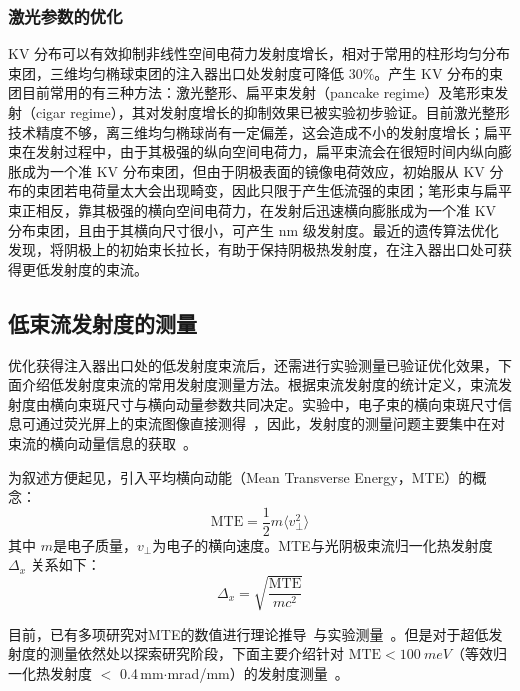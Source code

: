 \subsubsection{激光参数的优化}
KV 分布\cite{Kapchinskij:1959aa}可以有效抑制非线性空间电荷力发射度增长\cite{Limborg-Deprey:2006aa,Khojoyan:2013aa}，相对于常用的柱形均匀分布束团，三维均匀椭球束团的注入器出口处发射度可降低 30\%\cite{Khojoyan:2014aa}。产生 KV 分布的束团目前常用的有三种方法：激光整形、扁平束发射（pancake regime）及笔形束发射（cigar regime），其对发射度增长的抑制效果已被实验初步验证\cite{Khojoyan:2013aa,Khojoyan:2014aa,Musumeci:2008ab,Li:2012aa}。目前激光整形技术精度不够，离三维均匀椭球尚有一定偏差，这会造成不小的发射度增长\cite{Khojoyan:2013aa}；扁平束在发射过程中，由于其极强的纵向空间电荷力，扁平束流会在很短时间内纵向膨胀成为一个准 KV 分布束团，但由于阴极表面的镜像电荷效应，初始服从 KV 分布的束团若电荷量太大会出现畸变，因此只限于产生低流强的束团\cite{Musumeci:2008ab}；笔形束与扁平束正相反，靠其极强的横向空间电荷力，在发射后迅速横向膨胀成为一个准 KV 分布束团，且由于其横向尺寸很小，可产生 nm 级发射度\cite{Li:2012aa}。最近的遗传算法优化发现，将阴极上的初始束长拉长，有助于保持阴极热发射度，在注入器出口处可获得更低发射度的束流\cite{Qian:2016aa}。

\subsection{低束流发射度的测量}
优化获得注入器出口处的低发射度束流后，还需进行实验测量已验证优化效果，下面介绍低发射度束流的常用发射度测量方法。根据束流发射度的统计定义，束流发射度由横向束斑尺寸与横向动量参数共同决定。实验中，电子束的横向束斑尺寸信息可通过荧光屏上的束流图像直接测得~\cite{Graves:1997aa,Walasek-Hohne:2011aa}，因此，发射度的测量问题主要集中在对束流的横向动量信息的获取~\cite{lee2015review}。

为叙述方便起见，引入平均横向动能（Mean Transverse Energy，MTE）的概念\cite{bazarov2008thermal,bazarov2009maximum,lee2015review}：
\begin{equation}
\text{MTE} = \frac{1}{2}m\langle v_\perp^2\rangle
\end{equation}
其中 $m$是电子质量，$v_\perp$为电子的横向速度。MTE与光阴极束流归一化热发射度 $\Delta_{x}$ 关系如下：
\begin{equation}
\label{eq:es_MTE}
\Delta_{x} = \sqrt{\frac{\text{MTE}}{mc^2}}
\end{equation}

目前，已有多项研究对MTE的数值进行理论推导~\cite{karkare2011effect,karkare2013monte}与实验测量~\cite{bazarov2009maximum,engelen2014effective,dowell2009quantum,qian2012experimental}。但是对于超低发射度的测量依然处以探索研究阶段，下面主要介绍针对 $\text{MTE}<\SI{100}{meV}$（等效归一化热发射度 $<$ 0.4\,mm$\cdot$mrad/mm）的发射度测量~\cite{hauri2010intrinsic,lee2015review}。

